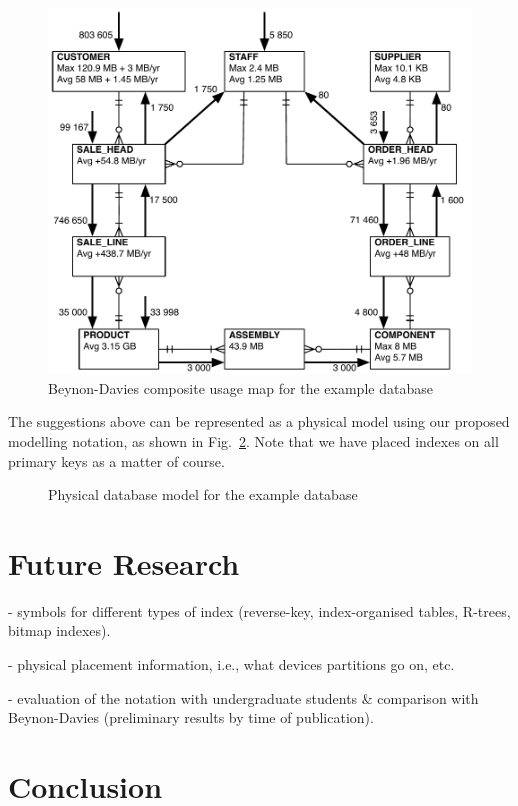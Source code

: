 \documentclass{llncs}
\begin{document}
\begin{figure}
	\includegraphics[width=\columnwidth,keepaspectratio]{Beynon-Davies}
	\caption{Beynon-Davies composite usage map for the example database}
	\label{fig-Beynon-Davies}
\end{figure}

The suggestions above can be represented as a physical model using our
proposed modelling notation, as shown in Fig.~\ref{fig-physical-model}.
Note that we have placed indexes on all primary keys as a matter of
course.

\begin{figure}
	\caption{Physical database model for the example database}
	\label{fig-physical-model}
\end{figure}


\section{Future Research}
\label{sec-future}

- symbols for different types of index (reverse-key, index-organised
tables, R-trees, bitmap indexes).

- physical placement information, i.e., what devices partitions go on, etc.

- evaluation of the notation with undergraduate students \& comparison
with Beynon-Davies (preliminary results by time of publication).


\section{Conclusion}
\label{sec-conclusion}





\end{document}
